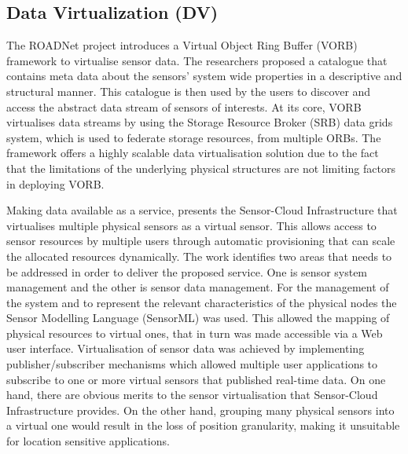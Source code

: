 \subsection{Data Virtualization (DV)}
The ROADNet \cite{Rajasekar:2005:ASD:1080885.1080892} project introduces a Virtual Object Ring Buffer (VORB) framework  to virtualise sensor data. The researchers proposed a catalogue that contains meta data about the sensors' system wide properties in a descriptive and structural manner. This catalogue is then used by the users to discover and access the abstract data stream of sensors of interests. At its core, VORB virtualises data streams by using the Storage Resource Broker (SRB) data grids system, which is used to federate storage resources, from multiple ORBs. The framework offers a highly scalable data virtualisation solution due to the fact that the limitations of the underlying physical structures are not limiting factors in deploying VORB. 

Making data available as a service, \cite{yuriyama2010sensor} presents the Sensor-Cloud Infrastructure that virtualises multiple physical sensors as a virtual sensor. This allows access to sensor resources by multiple users through automatic provisioning that can scale the allocated resources dynamically. The work identifies two areas that needs to be addressed in order to deliver the proposed service. One is sensor system management and the other is sensor data management. For the management of the system and to represent the relevant characteristics of the physical nodes the Sensor Modelling Language (SensorML) was used. This allowed the mapping of physical resources to virtual ones, that in turn was made accessible via a Web user interface. Virtualisation of sensor data was achieved by implementing publisher/subscriber mechanisms which allowed multiple user applications to subscribe to one or more virtual sensors that published real-time data. On one hand, there are obvious merits to the sensor virtualisation that Sensor-Cloud Infrastructure provides. On the other hand, grouping many physical sensors into a virtual one would result in the loss of position granularity, making it unsuitable for location sensitive applications. 





